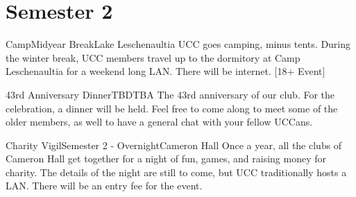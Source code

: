 \section{Semester 2}
	\begin{event}{Camp}{Midyear Break}{Lake Leschenaultia}
		UCC goes camping, minus tents. During the winter break, UCC members travel up to the dormitory at Camp Leschenaultia for a weekend long LAN. There will be internet. [18+ Event]
	\end{event}
	\begin{event}{43rd Anniversary Dinner}{TBD}{TBA}
		The 43rd anniversary of our club. For the celebration, a dinner will be held. Feel free to come along to meet some of the older members, as well to have a general chat with your fellow UCCans.
	\end{event}
	\begin{event}{Charity Vigil}{Semester 2 - Overnight}{Cameron Hall}
		Once a year, all the clubs of Cameron Hall get together for a night of fun, games, and raising money for charity. The details of the night are still to come, but UCC traditionally hosts a LAN. There will be an entry fee for the event.
	\end{event}
